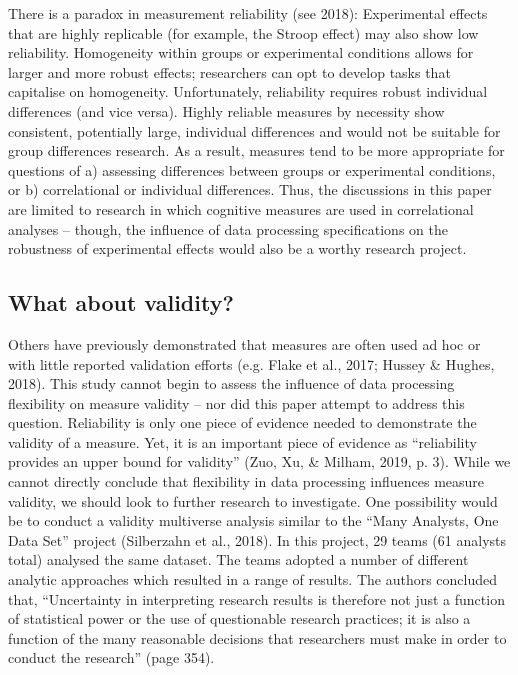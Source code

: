 \documentclass[english,man,floatsintext]{apa6}
\begin{document}
There is a paradox in measurement reliability (see 2018): Experimental effects that are highly replicable (for example, the Stroop effect) may also show low reliability. Homogeneity within groups or experimental conditions allows for larger and more robust effects; researchers can opt to develop tasks that capitalise on homogeneity. Unfortunately, reliability requires robust individual differences (and vice versa). Highly reliable measures by necessity show consistent, potentially large, individual differences and would not be suitable for group differences research. As a result, measures tend to be more appropriate for questions of a) assessing differences between groups or experimental conditions, or b) correlational or individual differences. Thus, the discussions in this paper are limited to research in which cognitive measures are used in correlational analyses -- though, the influence of data processing specifications on the robustness of experimental effects would also be a worthy research project.

\hypertarget{what-about-validity}{%
\subsection{What about validity?}\label{what-about-validity}}

Others have previously demonstrated that measures are often used ad hoc or with little reported validation efforts (e.g. Flake et al., 2017; Hussey \& Hughes, 2018). This study cannot begin to assess the influence of data processing flexibility on measure validity -- nor did this paper attempt to address this question. Reliability is only one piece of evidence needed to demonstrate the validity of a measure. Yet, it is an important piece of evidence as \enquote{reliability provides an upper bound for validity} (Zuo, Xu, \& Milham, 2019, p. 3). While we cannot directly conclude that flexibility in data processing influences measure validity, we should look to further research to investigate. One possibility would be to conduct a validity multiverse analysis similar to the \enquote{Many Analysts, One Data Set} project (Silberzahn et al., 2018). In this project, 29 teams (61 analysts total) analysed the same dataset. The teams adopted a number of different analytic approaches which resulted in a range of results. The authors concluded that, \enquote{Uncertainty in interpreting research results is therefore not just a function of statistical power or the use of questionable research practices; it is also a function of the many reasonable decisions that researchers must make in order to conduct the research} (page 354).
\end{document}
